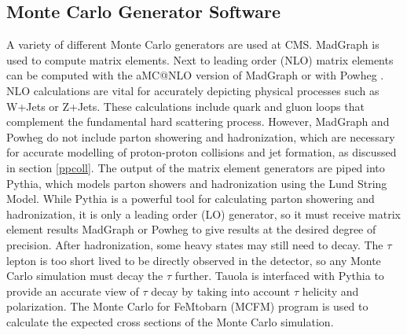 \documentclass[oneside, letterpaper, oldfontcommands]{memoir}
\begin{document}
\subsection{Monte Carlo Generator Software}\label{mcsoftware}

\qquad A variety of different Monte Carlo generators are used at CMS. {\sc MadGraph} \cite{Alwall:2014hca} is used to compute matrix elements. Next to leading order (NLO) matrix elements can be computed with the aMC@NLO\cite{Alwall:2014hca} version of {\sc MadGraph} or with {\sc Powheg}\cite{Alioli:2010xd} \cite{Frixione:2007vw} \cite{Nason:2004rx}. NLO calculations are vital for accurately depicting physical processes such as W+Jets or Z+Jets. These calculations include quark and gluon loops that complement the fundamental hard scattering process. However, {\sc MadGraph} and {\sc Powheg} do not include parton showering and hadronization, which are necessary for accurate modelling of proton-proton collisions and jet formation, as discussed in section \ref{ppcoll}. The output of the matrix element generators are piped into {\sc Pythia}, which models parton showers and hadronization using the Lund String Model. While {\sc Pythia} is a powerful tool for calculating parton showering and hadronization, it is only a leading order (LO) generator, so it must receive matrix element results {\sc MadGraph} or {\sc Powheg} to give results at the desired degree of precision. After hadronization, some heavy states may still need to decay. The $\tau$ lepton is too short lived to be directly observed in the detector, so any Monte Carlo simulation must decay the $\tau$ further. 
{\sc Tauola} \cite{Was:2011tv} is interfaced with {\sc Pythia} to provide an accurate view of $\tau$ decay by taking into account $\tau$ helicity and polarization. The Monte Carlo for FeMtobarn (MCFM) program \cite{Campbell:1999ah}\cite{Campbell:2011bn}\cite{Campbell:2015qma} is used to calculate the expected cross sections of the Monte Carlo simulation. 
\end{document}
